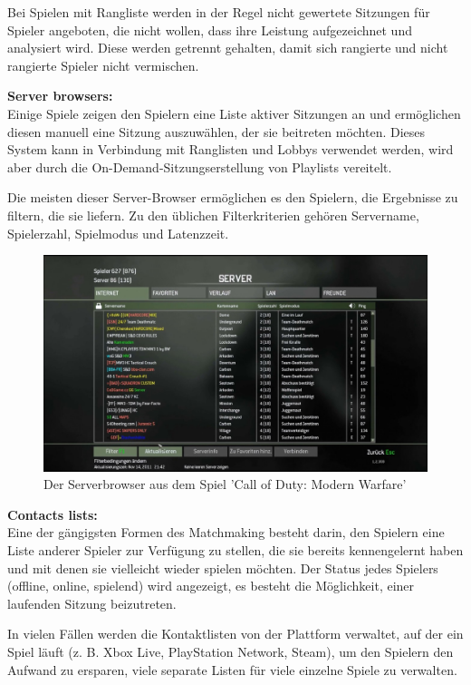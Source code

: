 Bei Spielen mit Rangliste werden in der Regel nicht gewertete Sitzungen für Spieler angeboten, die nicht wollen, dass ihre Leistung aufgezeichnet und analysiert wird. Diese werden getrennt gehalten, damit sich rangierte und nicht rangierte Spieler nicht vermischen.

\cite{Wikipedia.2021b}

\textbf{Server browsers:} \\
Einige Spiele zeigen den Spielern eine Liste aktiver Sitzungen an und ermöglichen diesen manuell eine Sitzung auszuwählen, der sie beitreten möchten. Dieses System kann in Verbindung mit Ranglisten und Lobbys verwendet werden, wird aber durch die On-Demand-Sitzungserstellung von Playlists vereitelt.

Die meisten dieser Server-Browser ermöglichen es den Spielern, die Ergebnisse zu filtern, die sie liefern. Zu den üblichen Filterkriterien gehören Servername, Spielerzahl, Spielmodus und Latenzzeit. 

\begin{figure}[H]
	\centering
	\includegraphics[width=120mm]{images/call_of_Duty_serverbrowser.jpg}
	\caption['Call of Duty Modern Warfare' Serverbrowser]{Der Serverbrowser aus dem Spiel 'Call of Duty: Modern Warfare'}
	\label{pic:call_of_Duty_serverbrowser}
\end{figure}


\cite{Wikipedia.2021b}

\textbf{Contacts lists:} \\
Eine der gängigsten Formen des Matchmaking besteht darin, den Spielern eine Liste anderer Spieler zur Verfügung zu stellen, die sie bereits kennengelernt haben und mit denen sie vielleicht wieder spielen möchten. Der Status jedes Spielers (offline, online, spielend) wird angezeigt, es besteht die Möglichkeit, einer laufenden Sitzung beizutreten.

In vielen Fällen werden die Kontaktlisten von der Plattform verwaltet, auf der ein Spiel läuft (z. B. Xbox Live, PlayStation Network, Steam), um den Spielern den Aufwand zu ersparen, viele separate Listen für viele einzelne Spiele zu verwalten. \cite{Wikipedia.2021b}
